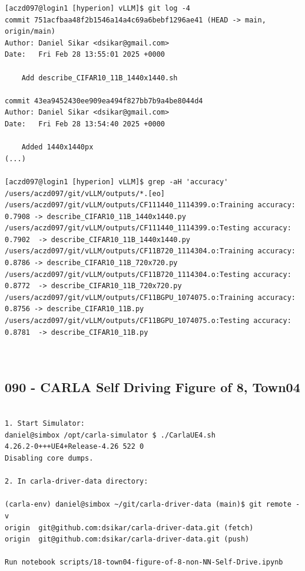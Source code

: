 \begin{verbatim}
[aczd097@login1 [hyperion] vLLM]$ git log -4
commit 751acfbaa48f2b1546a14a4c69a6bebf1296ae41 (HEAD -> main, origin/main)
Author: Daniel Sikar <dsikar@gmail.com>
Date:   Fri Feb 28 13:55:01 2025 +0000

    Add describe_CIFAR10_11B_1440x1440.sh

commit 43ea9452430ee909ea494f827bb7b9a4be8044d4
Author: Daniel Sikar <dsikar@gmail.com>
Date:   Fri Feb 28 13:54:40 2025 +0000

    Added 1440x1440px
(...)

[aczd097@login1 [hyperion] vLLM]$ grep -aH 'accuracy' /users/aczd097/git/vLLM/outputs/*.[eo]
/users/aczd097/git/vLLM/outputs/CF111440_1114399.o:Training accuracy: 0.7908 -> describe_CIFAR10_11B_1440x1440.py
/users/aczd097/git/vLLM/outputs/CF111440_1114399.o:Testing accuracy: 0.7902  -> describe_CIFAR10_11B_1440x1440.py
/users/aczd097/git/vLLM/outputs/CF11B720_1114304.o:Training accuracy: 0.8786 -> describe_CIFAR10_11B_720x720.py
/users/aczd097/git/vLLM/outputs/CF11B720_1114304.o:Testing accuracy: 0.8772  -> describe_CIFAR10_11B_720x720.py
/users/aczd097/git/vLLM/outputs/CF11BGPU_1074075.o:Training accuracy: 0.8756 -> describe_CIFAR10_11B.py
/users/aczd097/git/vLLM/outputs/CF11BGPU_1074075.o:Testing accuracy: 0.8781  -> describe_CIFAR10_11B.py

    
\end{verbatim}
\subsection{090 - CARLA Self Driving Figure of 8, Town04}
\label{app_res:090}

\begin{verbatim}

1. Start Simulator:
daniel@simbox /opt/carla-simulator $ ./CarlaUE4.sh 
4.26.2-0+++UE4+Release-4.26 522 0
Disabling core dumps.

2. In carla-driver-data directory:

(carla-env) daniel@simbox ~/git/carla-driver-data (main)$ git remote -v
origin  git@github.com:dsikar/carla-driver-data.git (fetch)
origin  git@github.com:dsikar/carla-driver-data.git (push)

Run notebook scripts/18-town04-figure-of-8-non-NN-Self-Drive.ipynb

\end{verbatim}


